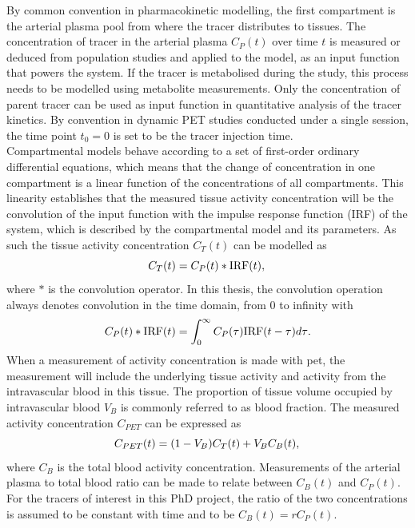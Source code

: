 By common convention in pharmacokinetic modelling, the first compartment is the arterial plasma pool from where the tracer distributes to tissues. The concentration of tracer in the arterial plasma $C_P(t)$ over time $t$ is measured or deduced from population studies and applied to the model, as an input function that powers the system.
If the tracer is metabolised during the study, this process needs to be modelled using metabolite measurements. Only the concentration of parent tracer can be used as input function in quantitative analysis of the tracer kinetics.
By convention in dynamic PET studies conducted under a single session, the time point $t_0=0$ is set to be the tracer injection time. \\
Compartmental models behave according to a set of first-order ordinary differential equations, which means that the change of concentration in one compartment is a linear function of the concentrations of all compartments. This linearity establishes that the measured tissue activity concentration will be the convolution of the input function with the impulse response function (IRF) of the system, which is described by the compartmental model and its parameters.
As such the tissue activity concentration $C_T(t)$ can be modelled as
\begin{equation}
 C_T(t) = C_P(t) \ast \textrm{IRF}(t)  \\ , \\ 
\end{equation}
where $\ast$ is the convolution operator. In this thesis, the convolution operation always denotes convolution in the time domain, from 0 to infinity with
\begin{equation}
C_P(t) \ast \textrm{IRF}(t) = \int_{0}^{\infty} C_P(\tau) \textrm{IRF}(t-\tau) d\tau \  \\ . \\ 
\end{equation}
When a measurement of activity concentration is made with \gls{pet}, the measurement will include the underlying tissue activity and activity from the intravascular blood in this tissue. The proportion of tissue volume occupied by intravascular blood $V_B$ is commonly referred to as blood fraction. The measured activity concentration $C_{PET}$ can be expressed as
\begin{equation}
{C_{PET}}(t)  = (1-V_{B}){C_{T}}(t) + V_{B}C_{B}(t) \\ , \\
\label{eqn:CPET}
\end{equation}
where $C_{B}$ is the total blood activity concentration.
Measurements of the %
arterial plasma to total blood ratio can be made to relate between $C_{B}(t)$ and $C_P(t)$. 
For the tracers of interest in this PhD project, the ratio of the two concentrations is assumed to be constant with time and to be $C_{B}(t) = r C_{P}(t)$. 

